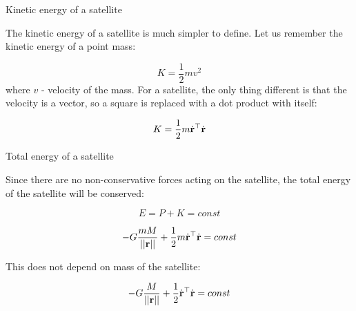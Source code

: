 \documentclass{beamer}
\begin{document}
\begin{frame}{Kinetic energy of a satellite}
	\begin{flushleft}
		
		The kinetic energy of a satellite is much simpler to define. Let us remember the kinetic energy of a point mass:
		
		\begin{equation}
			K = \frac{1}{2} m v^2
		\end{equation}
	where $v$ - velocity of the mass. For a satellite, the only thing different is that the velocity is a vector, so a square is replaced with a dot product with itself:
	
			\begin{equation}
		K = \frac{1}{2} m \dot{\mathbf{r}}^\top \dot{\mathbf{r}}
			\end{equation}
	
		
	\end{flushleft}
\end{frame}




\begin{frame}{Total energy of a satellite}
	\begin{flushleft}
		
		Since there are no non-conservative forces acting on the satellite, the total energy of the satellite will be conserved:
		
			
		\begin{equation}
			E = P + K = const
		\end{equation}
			
		\begin{equation}
			-G \frac{m M}{||\mathbf{r}||} +  \frac{1}{2} m \dot{\mathbf{r}}^\top \dot{\mathbf{r}} = const
		\end{equation}
	
		This does not depend on mass of the satellite:
		
		\begin{equation}
			-G \frac{M}{||\mathbf{r}||} +  \frac{1}{2} \dot{\mathbf{r}}^\top \dot{\mathbf{r}} = const
		\end{equation}		
		
	\end{flushleft}
\end{frame}
\end{document}
